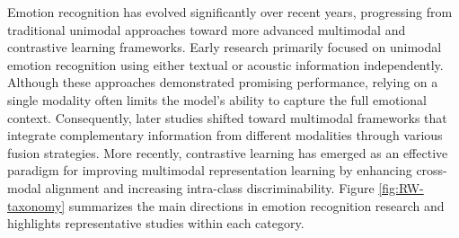 Emotion recognition has evolved significantly over recent years, progressing from traditional unimodal approaches toward more advanced multimodal and contrastive learning frameworks. Early research primarily focused on unimodal emotion recognition using either textual or acoustic information independently\cite{Cortiz2022, Batbaatar2019, Han2023, Mustaqeem2020, Venkataramanan2019, Novais2023, Atmaja2022, Yingzhi2021}. Although these approaches demonstrated promising performance, relying on a single modality often limits the model’s ability to capture the full emotional context. Consequently, later studies shifted toward multimodal frameworks that integrate complementary information from different modalities through various fusion strategies\cite{Koudounas2026, Chen2020, Chudasama2022, Dikbiyik2025, ISLAM2026, Kakuba2023, Krishna2020, KIM2026, PAYALA2026, Sebastian2019}. More recently, contrastive learning has emerged as an effective paradigm for improving multimodal representation learning by enhancing cross-modal alignment and increasing intra-class discriminability\cite{qian2022, Kim2023, Shi2024, Li2025, Jing2026, Nguyen2024}. Figure \ref{fig:RW-taxonomy} summarizes the main directions in emotion recognition research and highlights representative studies within each category.


